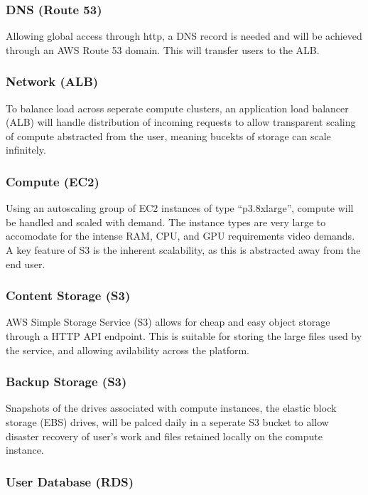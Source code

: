 \subsubsection*{DNS (Route 53)}

Allowing global access through http, a DNS record is needed and will be achieved through an AWS Route 53 domain. This will transfer users to the ALB.

\subsubsection*{Network (ALB)}

To balance load across seperate compute clusters, an application load balancer (ALB) will handle distribution of incoming requests to allow transparent scaling of compute abstracted from the user, meaning bucekts of storage can scale infinitely.

\subsubsection*{Compute (EC2)}

Using an autoscaling group of EC2 instances of type ``p3.8xlarge'', compute will be handled and scaled with demand. The instance types are very large to accomodate for the intense RAM, CPU, and GPU requirements video demands. A key feature of S3 is the inherent scalability, as this is abstracted away from the end user.

\subsubsection*{Content Storage (S3)}

AWS Simple Storage Service (S3) allows for cheap and easy object storage through a HTTP API endpoint. This is suitable for storing the large files used by the service, and allowing avilability across the platform.

\subsubsection*{Backup Storage (S3)}

Snapshots of the drives associated with compute instances, the elastic block storage (EBS) drives, will be palced daily in a seperate S3 bucket to allow disaster recovery of user's work and files retained locally on the compute instance.

\subsubsection*{User Database (RDS)}

